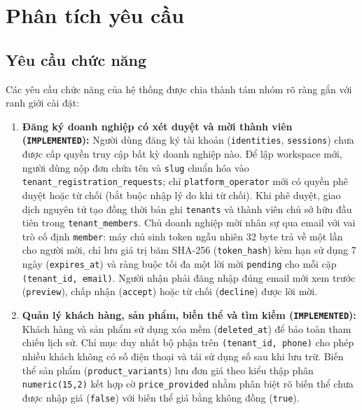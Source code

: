 \section{Phân tích yêu cầu}
\subsection{Yêu cầu chức năng}
Các yêu cầu chức năng của hệ thống được chia thành tám nhóm rõ ràng gắn với ranh giới cài đặt:
\begin{enumerate}
  \item \textbf{Đăng ký doanh nghiệp có xét duyệt và mời thành viên (\texttt{IMPLEMENTED}):} Người dùng đăng ký tài khoản (\texttt{identities}, \texttt{sessions}) chưa được cấp quyền truy cập bất kỳ doanh nghiệp nào.
    Để lập workspace mới, người dùng nộp đơn chứa tên và \texttt{slug} chuẩn hóa vào \texttt{tenant\_\hspace{0pt}registration\_\hspace{0pt}requests}; chỉ \texttt{platform\_\hspace{0pt}operator} mới có quyền phê duyệt hoặc từ chối (bắt buộc nhập lý do khi từ chối).
    Khi phê duyệt, giao dịch nguyên tử tạo đồng thời bản ghi \texttt{tenants} và thành viên chủ sở hữu đầu tiên trong \texttt{tenant\_\hspace{0pt}members}.
    Chủ doanh nghiệp mời nhân sự qua email với vai trò cố định \texttt{member}: máy chủ sinh token ngẫu nhiên 32 byte trả về một lần cho người mời, chỉ lưu giá trị băm SHA-256 (\texttt{token\_\hspace{0pt}hash}) kèm hạn sử dụng 7 ngày (\texttt{expires\_\hspace{0pt}at}) và ràng buộc tối đa một lời mời \texttt{pending} cho mỗi cặp \texttt{(tenant\_\hspace{0pt}id, email)}.
    Người nhận phải đăng nhập đúng email mới xem trước (\texttt{preview}), chấp nhận (\texttt{accept}) hoặc từ chối (\texttt{decline}) được lời mời.
  \item \textbf{Quản lý khách hàng, sản phẩm, biến thể và tìm kiếm (\texttt{IMPLEMENTED}):} Khách hàng và sản phẩm sử dụng xóa mềm (\texttt{deleted\_\hspace{0pt}at}) để bảo toàn tham chiếu lịch sử.
    Chỉ mục duy nhất bộ phận trên \texttt{(tenant\_\hspace{0pt}id, phone)} cho phép nhiều khách không có số điện thoại và tái sử dụng số sau khi lưu trữ.
    Biến thể sản phẩm (\texttt{product\_\hspace{0pt}variants}) lưu đơn giá theo kiểu thập phân \texttt{numeric(15,2)} kết hợp cờ \texttt{price\_\hspace{0pt}provided} nhằm phân biệt rõ biến thể chưa được nhập giá (\texttt{false}) với biến thể giá bằng không đồng (\texttt{true}).

\end{enumerate}
